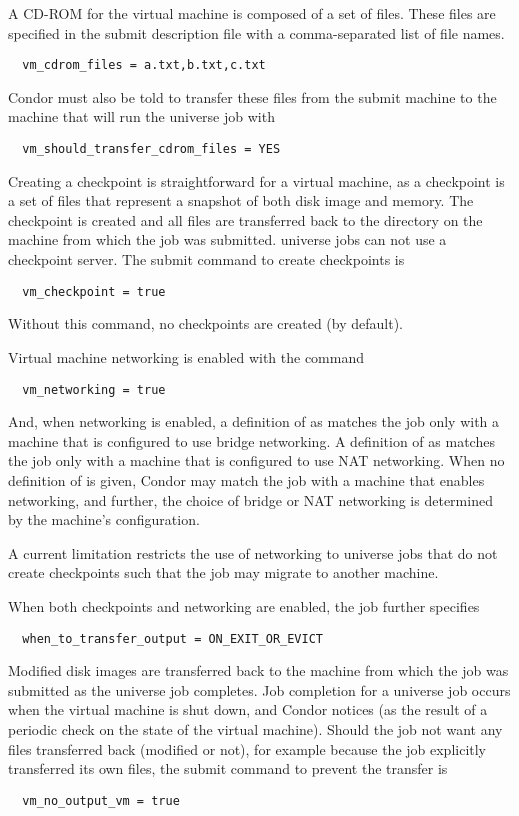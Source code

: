 A CD-ROM for the virtual machine is composed of a set of files.
These files are specified in the submit description file
with a comma-separated list of file names.
\begin{verbatim}
  vm_cdrom_files = a.txt,b.txt,c.txt
\end{verbatim}
Condor must also be told to transfer these files from
the submit machine to the machine that will run the
 universe job with 
\begin{verbatim}
  vm_should_transfer_cdrom_files = YES
\end{verbatim}

Creating a checkpoint is straightforward for a virtual machine,
as a checkpoint is a set of files that represent
a snapshot of both disk image and memory.
The checkpoint is created and all files are transferred back
to the  directory on the machine from which
the job was submitted.
 universe jobs can not use a checkpoint server.
The submit command to create checkpoints is
\begin{verbatim}
  vm_checkpoint = true
\end{verbatim}
Without this command, no checkpoints are created (by default).

Virtual machine networking is enabled with the command
\begin{verbatim}
  vm_networking = true
\end{verbatim}
And, when networking is enabled, a definition of
 as 
matches the job only with a machine that is configured to use
bridge networking.
A definition of
 as 
matches the job only with a machine that is configured to use
NAT networking.
When no definition of
 is given,
Condor may
match the job with a machine that enables networking,
and further, the choice of bridge or NAT networking
is determined by the machine's configuration.

A current limitation restricts the use of networking to
 universe jobs that do not create checkpoints
such that the job may migrate to another machine.

When both checkpoints and networking are enabled,
the job further specifies
\begin{verbatim}
  when_to_transfer_output = ON_EXIT_OR_EVICT
\end{verbatim}

Modified disk images are transferred back to the machine from which
the job was submitted as the  universe job completes.
Job completion for a  universe job occurs when 
the virtual machine is shut down, and Condor notices 
(as the result of a periodic check on the state of the virtual machine).
Should the job not want any files transferred back (modified or not),
for example because the job explicitly transferred its own files,
the submit command to prevent the transfer is
\begin{verbatim}
  vm_no_output_vm = true
\end{verbatim}

